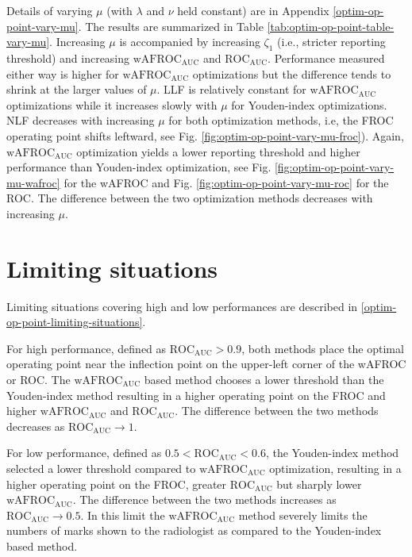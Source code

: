 \documentclass[
]{book}
\begin{document}
Details of varying \(\mu\) (with \(\lambda\) and \(\nu\) held constant) are in Appendix \ref{optim-op-point-vary-mu}. The results are summarized in Table \ref{tab:optim-op-point-table-vary-mu}. Increasing \(\mu\) is accompanied by increasing \(\zeta_1\) (i.e., stricter reporting threshold) and increasing \(\text{wAFROC}_\text{AUC}\) and \(\text{ROC}_\text{AUC}\). Performance measured either way is higher for \(\text{wAFROC}_\text{AUC}\) optimizations but the difference tends to shrink at the larger values of \(\mu\). LLF is relatively constant for \(\text{wAFROC}_\text{AUC}\) optimizations while it increases slowly with \(\mu\) for Youden-index optimizations. NLF decreases with increasing \(\mu\) for both optimization methods, i.e, the FROC operating point shifts leftward, see Fig. \ref{fig:optim-op-point-vary-mu-froc}). Again, \(\text{wAFROC}_\text{AUC}\) optimization yields a lower reporting threshold and higher performance than Youden-index optimization, see Fig. \ref{fig:optim-op-point-vary-mu-wafroc} for the wAFROC and Fig. \ref{fig:optim-op-point-vary-mu-roc} for the ROC. The difference between the two optimization methods decreases with increasing \(\mu\).

\hypertarget{optim-op-point-vary-nu-limiting-situations}{%
\section{Limiting situations}\label{optim-op-point-vary-nu-limiting-situations}}

Limiting situations covering high and low performances are described in \ref{optim-op-point-limiting-situations}.

For high performance, defined as \(\text{ROC}_\text{AUC} > 0.9\), both methods place the optimal operating point near the inflection point on the upper-left corner of the wAFROC or ROC. The \(\text{wAFROC}_\text{AUC}\) based method chooses a lower threshold than the Youden-index method resulting in a higher operating point on the FROC and higher \(\text{wAFROC}_\text{AUC}\) and \(\text{ROC}_\text{AUC}\). The difference between the two methods decreases as \(\text{ROC}_\text{AUC} \rightarrow 1\).

For low performance, defined as \(0.5 < \text{ROC}_\text{AUC} < 0.6\), the Youden-index method selected a lower threshold compared to \(\text{wAFROC}_\text{AUC}\) optimization, resulting in a higher operating point on the FROC, greater \(\text{ROC}_\text{AUC}\) but sharply lower \(\text{wAFROC}_\text{AUC}\). The difference between the two methods increases as \(\text{ROC}_\text{AUC} \rightarrow 0.5\). In this limit the \(\text{wAFROC}_\text{AUC}\) method severely limits the numbers of marks shown to the radiologist as compared to the Youden-index based method.
\end{document}
